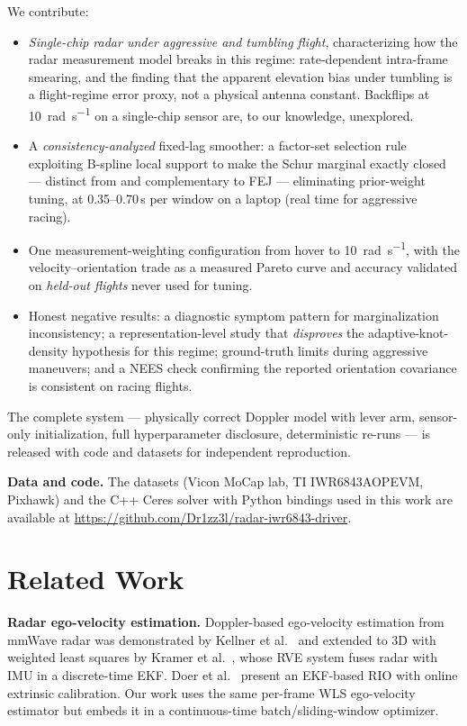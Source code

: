 \documentclass[journal]{IEEEtran}
\begin{document}
We contribute:
\begin{itemize}
  \item \emph{Single-chip radar under aggressive and tumbling flight},
        characterizing how the radar measurement model breaks in this
        regime: rate-dependent intra-frame smearing, and the finding
        that the apparent elevation bias under tumbling is a
        flight-regime error proxy, not a physical antenna constant.
        Backflips at \SI{10}{\radian\per\second} on a single-chip
        sensor are, to our knowledge, unexplored.
  \item A \emph{consistency-analyzed} fixed-lag smoother: a factor-set
        selection rule exploiting B-spline local support to make the
        Schur marginal exactly closed --- distinct from and
        complementary to FEJ --- eliminating prior-weight tuning, at
        0.35--0.70\,s per window on a laptop (real time for aggressive
        racing).
  \item One measurement-weighting configuration from hover to
        \SI{10}{\radian\per\second}, with the velocity--orientation
        trade as a measured Pareto curve and accuracy validated on
        \emph{held-out flights} never used for tuning.
  \item Honest negative results: a diagnostic symptom pattern for
        marginalization inconsistency; a representation-level study
        that \emph{disproves} the adaptive-knot-density hypothesis for
        this regime; ground-truth limits during aggressive maneuvers;
        and a NEES check confirming the reported orientation covariance
        is consistent on racing flights.
\end{itemize}
The complete system --- physically correct Doppler model with lever
arm, sensor-only initialization, full hyperparameter disclosure,
deterministic re-runs --- is released with code and datasets for
independent reproduction.

\textbf{Data and code.}
The datasets (Vicon MoCap lab, TI IWR6843AOPEVM, Pixhawk) and the
C++ Ceres solver with Python bindings used in this work are available
at \url{https://github.com/Dr1zz3l/radar-iwr6843-driver}.

\section{Related Work}
\label{sec:related}

\textbf{Radar ego-velocity estimation.}
Doppler-based ego-velocity estimation from mmWave radar was
demonstrated by Kellner et al.~\cite{kellner2014instantaneous} and
extended to 3D with weighted least squares by
Kramer et al.~\cite{kramer2020rve}, whose RVE system fuses radar
with IMU in a discrete-time EKF.  Doer et
al.~\cite{doer2020ekf} present an EKF-based RIO with online
extrinsic calibration. Our work uses the same per-frame WLS
ego-velocity estimator but embeds it in a continuous-time
batch/sliding-window optimizer.
\end{document}
